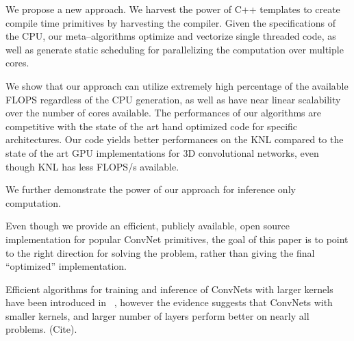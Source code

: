   We propose a new approach.  We harvest the power of C++ templates to
  create compile time primitives by harvesting the compiler.  Given
  the specifications of the CPU, our meta--algorithms optimize and
  vectorize single threaded code, as well as generate static
  scheduling for parallelizing the computation over multiple cores.

  We show that our approach can utilize extremely high percentage of
  the available FLOPS regardless of the CPU generation, as well as
  have near linear scalability over the number of cores available.
  The performances of our algorithms are competitive with the state of
  the art hand optimized code for specific architectures.  Our code
  yields better performances on the KNL compared to the state of the
  art GPU implementations for 3D convolutional networks, even though
  KNL has less FLOPS/s available.

  We further demonstrate the power of our approach for inference only
  computation.

  Even though we provide an efficient, publicly available, open source
  implementation for popular ConvNet primitives, the goal of this
  paper is to point to the right direction for solving the problem,
  rather than giving the final ``optimized'' implementation.

  Efficient algorithms for training and inference of ConvNets with
  larger kernels have been introduced in
  ~\cite{zlateski2016znn,zlateski2016znni}, however the evidence
  suggests that ConvNets with smaller kernels, and larger number of
  layers perform better on nearly all problems. (Cite).






